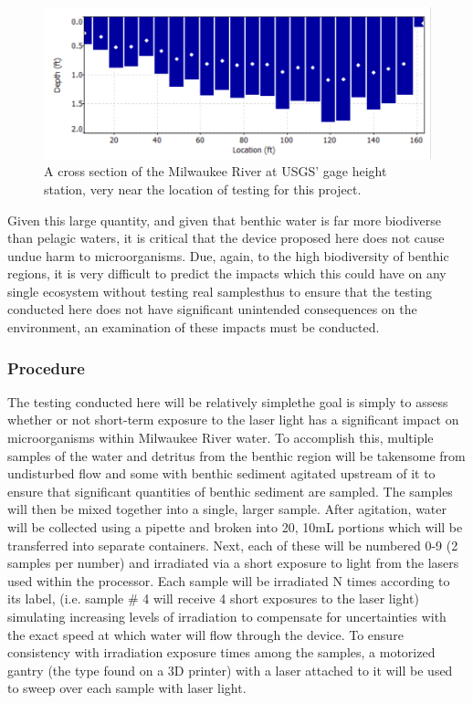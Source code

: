 \documentclass[fleqn,10pt]{SelfArx} %
\begin{document}
	\begin{figure}[h]
		\centering
		\includegraphics[width=1\linewidth]{Figures/RiverCrosssection}
		\caption[River Cross Section]{A cross section of the Milwaukee River at USGS' gage height station, very near the location of testing for this project.}
		\label{fig:riverCrosssec}
	\end{figure}
	
	Given this large quantity, and given that \gls{benthic} water is far more biodiverse than \gls{pelagic} waters, it is critical that the device proposed here does not cause undue harm to microorganisms. Due, again, to the high biodiversity of \gls{benthic} regions, it is very difficult to predict the impacts which this could have on any single ecosystem without testing real samples\textemdash thus to ensure that the testing conducted here does not have significant unintended consequences on the environment, an examination of these impacts must be conducted. 
	
	\subsubsection{Procedure}
	The testing conducted here will be relatively simple\textemdash the goal is simply to assess whether or not short-term exposure to the laser light has a significant impact on microorganisms within Milwaukee River water. To accomplish this, multiple samples of the water and detritus from the \gls{benthic} region will be taken\textemdash some from undisturbed flow and some with \gls{benthic} sediment agitated upstream of it to ensure that significant quantities of \gls{benthic} sediment are sampled. The samples will then be mixed together into a single, larger sample. After agitation, water will be collected using a pipette and broken into 20, 10mL portions which will be transferred into separate containers. 
	Next, each of these will be numbered 0-9 (2 samples per number) and irradiated via a short exposure to light from the lasers used within the processor. Each sample will be irradiated N times according to its label, (i.e. sample \# 4 will receive 4 short exposures to the laser light) simulating increasing levels of irradiation to compensate for uncertainties with the exact speed at which water will flow through the device. To ensure consistency with irradiation exposure times among the samples, a motorized gantry (the type found on a 3D printer) with a laser attached to it will be used to sweep over each sample with laser light.
	
\end{document}

